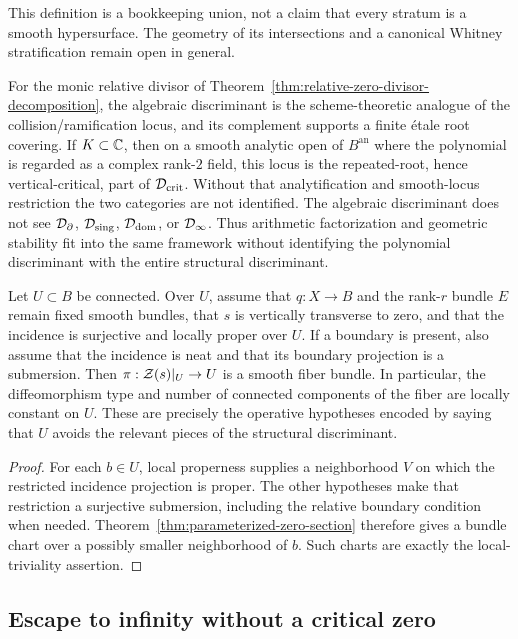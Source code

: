 This definition is a bookkeeping union, not a claim that every stratum is a smooth
hypersurface.  The geometry of its intersections and a canonical Whitney
stratification remain open in general.

For the monic relative divisor of
Theorem~\ref{thm:relative-zero-divisor-decomposition}, the algebraic discriminant
is the scheme-theoretic analogue of the collision/ramification locus, and its
complement supports a finite \'etale root covering.  If $K\subset\mathbb{C}$, then on a
smooth analytic open of $B^{\mathrm{an}}$ where the polynomial is regarded as a
complex rank-$2$ field, this locus is the repeated-root, hence vertical-critical,
part of $\mathcal D_{\mathrm{crit}}$.  Without that analytification and smooth-locus
restriction the two categories are not identified.  The algebraic discriminant
does not see $\mathcal D_\partial$, $\mathcal D_{\mathrm{sing}}$,
$\mathcal D_{\mathrm{dom}}$, or $\mathcal D_\infty$.  Thus arithmetic factorization and
geometric stability fit into the same framework without identifying the
polynomial discriminant with the entire structural discriminant.

\begin{corollary}
\label{cor:stability-off-discriminant}
Let $U\subset B$ be connected.  Over $U$, assume that $q:X\to B$ and the
rank-$r$ bundle $E$ remain fixed smooth bundles, that $s$ is vertically transverse
to zero, and that the incidence is surjective and locally proper over $U$.  If a
boundary is present, also assume that the incidence is neat and that its boundary
projection is a submersion.  Then
$\pi:\mathcal Z(s)|_U\to U$ is a smooth fiber bundle.  In particular, the diffeomorphism
type and number of connected components of the fiber are locally constant on $U$.
These are precisely the operative hypotheses encoded by saying that $U$ avoids
the relevant pieces of the structural discriminant.
\end{corollary}

\begin{proof}
For each $b\in U$, local properness supplies a neighborhood $V$ on which the
restricted incidence projection is proper.  The other hypotheses make that
restriction a surjective submersion, including the relative boundary condition
when needed.  Theorem~\ref{thm:parameterized-zero-section} therefore gives a
bundle chart over a possibly smaller neighborhood of $b$.  Such charts are exactly
the local-triviality assertion.
\end{proof}

\subsection{Escape to infinity without a critical zero}

